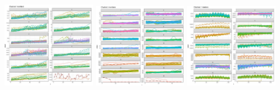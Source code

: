 \documentclass[c, dvipsnames]{beamer}  %
\begin{document}
\begin{frame}[shrink=5]
\frametitle{\insertsection} 
\framesubtitle{\insertsubsection}


%
%
%

\hfil\hfil\includegraphics[width=4cm]{screenshot047}\hfil\hfil
\includegraphics[width=4cm]{screenshot048}\hfil\hfil
\includegraphics[width=4cm]{screenshot050}\newline


\end{frame}
\end{document}
